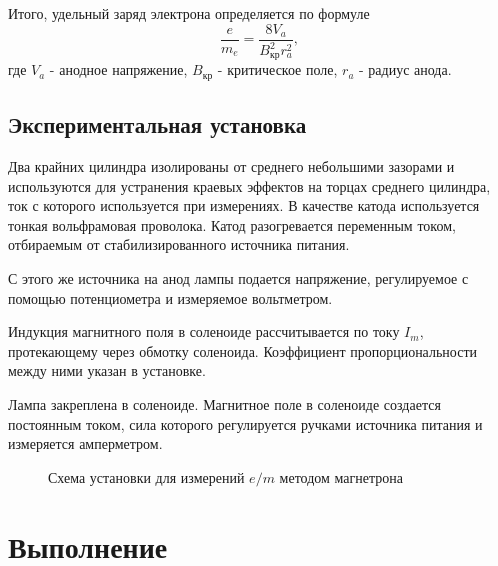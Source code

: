 \documentclass[a4paper,12pt]{article}
\begin{document}
	Итого, удельный заряд электрона определяется по формуле
	\begin{equation}
		\dfrac{e}{m_e} = \dfrac{8V_a}{B_{\text{кр}}^2r_a^2},
	\end{equation}
	где $V_a$ - анодное напряжение, $B_{\text{кр}}$ - критическое поле, $r_a$ - радиус анода.
	\subsection*{Экспериментальная установка}
	
	Два крайних цилиндра изолированы от среднего небольшими зазорами и используются для устранения краевых эффектов на торцах среднего цилиндра, ток с которого используется при измерениях. В качестве катода используется тонкая вольфрамовая проволока. Катод разогревается переменным током, отбираемым от стабилизированного источника питания. 
	
	С этого же источника на анод лампы подается напряжение, регулируемое с помощью потенциометра и измеряемое вольтметром.
	
	Индукция магнитного поля в соленоиде рассчитывается по току $I_m$, протекающему через обмотку соленоида. Коэффициент пропорциональности между ними указан в установке.
	
	Лампа закреплена в соленоиде. Магнитное поле в соленоиде создается постоянным током, сила которого регулируется ручками источника питания и измеряется амперметром.

	\begin{figure}[h!]
		\caption[]{\label{fig:3} Схема установки для измерений $e/m$ методом магнетрона}
	\end{figure}	

	\section{Выполнение}
	
\end{document}
